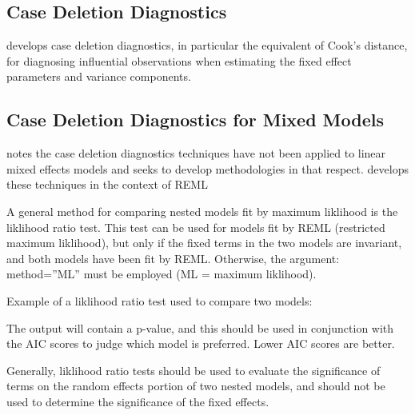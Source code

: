 \documentclass[12pt, a4paper]{report}
\theoremstyle{plain}
\theoremstyle{definition}
\theoremstyle{remark}
\begin{document}
% 
% 
% 


\subsection{Case Deletion Diagnostics} %


\citet{CPJ} develops  case deletion diagnostics, in particular the equivalent of  Cook's distance, for diagnosing influential observations when estimating the fixed effect parameters and variance components.


\subsection{Case Deletion Diagnostics for Mixed Models}

\citet{Christiansen} notes the case deletion diagnostics techniques have not been applied to linear mixed effects models and seeks to develop methodologies in that respect. \citet{Christiansen} develops these techniques in the context of REML





A general method for comparing nested models fit by maximum liklihood is the liklihood ratio 
test. This test can be used for models fit by REML (restricted maximum liklihood), but only if the 
fixed terms in the two models are invariant, and both models have been fit by REML. Otherwise, 
the argument: method=”ML” must be employed (ML = maximum liklihood). 

Example of a liklihood ratio test used to compare two models: 



The output will contain a p-value, and this should be used in conjunction with the AIC scores to 
judge which model is preferred. Lower AIC scores are better. 

Generally, liklihood ratio tests should be used to evaluate the significance of terms on the 
random effects portion of two nested models, and should not be used to determine the 
significance of the fixed effects. 
\end{document}
